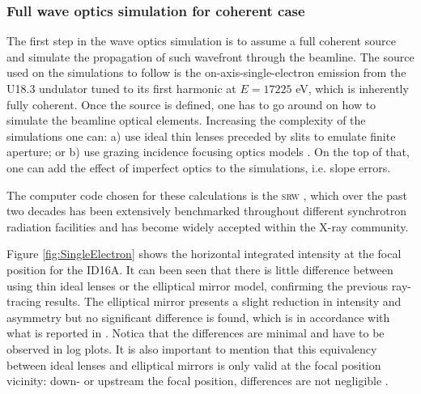 \documentclass{iucr}              %
\begin{document}
\subsubsection{Full wave optics simulation for coherent case}
% 
The first step in the wave optics simulation is to assume a full coherent source and simulate the propagation of such wavefront through the beamline. The source used on the simulations to follow is the on-axis-single-electron emission from the U18.3 undulator tuned to its first harmonic at $E=17225$ eV, which is inherently fully coherent. Once the source is defined, one has to go around on how to simulate the beamline optical elements. Increasing the complexity of the simulations one can: a) use ideal thin lenses preceded by slits to emulate finite aperture; or b) use grazing incidence focusing optics models \cite{Canestrari2014}. On the top of that, one can add the effect of imperfect optics to the simulations, i.e. slope errors. 

The computer code chosen for these calculations is the \textsc{srw} \cite{codeSRW}, which over the past two decades has been extensively benchmarked throughout different synchrotron radiation facilities and has become widely accepted within the X-ray community.

Figure \ref{fig:SingleElectron} shows the horizontal integrated intensity at the focal position for the ID16A. It can been seen that there is little difference between using thin ideal lenses or the elliptical mirror model, confirming the previous ray-tracing results. The elliptical mirror presents a slight reduction in intensity and asymmetry but no significant difference is found, which is in accordance with what is reported in \cite{Canestrari2014}. Notica that the differences are minimal and have to be observed in log plots. It is also important to mention that this equivalency between ideal lenses and elliptical mirrors is only valid at the focal position vicinity: down- or upstream the focal position, differences are not negligible \cite{Canestrari2014}. 
\end{document}
